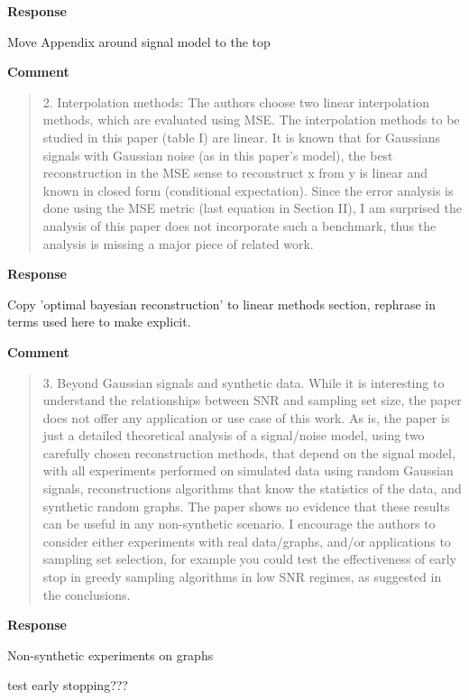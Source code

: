 \documentclass[11pt,onecolumn,journal]{IEEEtran}
\begin{document}
\textbf{Response}
\begin{todolist}
    \item Move Appendix around signal model to the top
\end{todolist}

\textbf{Comment}
\begin{quote}
2. Interpolation methods: The authors choose two linear interpolation methods, which are evaluated using MSE.  The interpolation methods to be studied in this paper (table I) are linear. It is known that for Gaussians signals with Gaussian noise (as in this paper’s model), the best reconstruction in the MSE sense to reconstruct x from y is linear and known in closed form (conditional expectation).  Since the error analysis is done using the MSE metric (last equation in Section II), I am surprised the analysis of this paper does not incorporate such a benchmark, thus the analysis is missing a major piece of related work.
\end{quote}
\textbf{Response}
\begin{todolist}
    \item Copy 'optimal bayesian reconstruction' to linear methods section, rephrase in terms used here to make explicit.
\end{todolist}

\textbf{Comment}
\begin{quote}
3. Beyond Gaussian signals and synthetic data. While it is interesting to understand the relationships between SNR and sampling set size, the paper does not offer any application or use case of this work. As is, the paper is just a detailed theoretical analysis of a signal/noise model, using two carefully chosen reconstruction methods, that depend on the signal model, with all experiments performed on simulated data using random Gaussian signals,  reconstructions algorithms that know the statistics of the data, and synthetic random graphs.  The paper shows no evidence that these results can be useful in any non-synthetic scenario.
I encourage the authors to consider either experiments with real data/graphs, and/or applications to sampling set selection,  for example you could test the effectiveness of early stop in greedy sampling algorithms in low SNR regimes, as suggested in the conclusions.
\end{quote}

\textbf{Response}
\begin{todolist}
    \item Non-synthetic experiments on graphs
    \item test early stopping???
\end{todolist}
\end{document}
